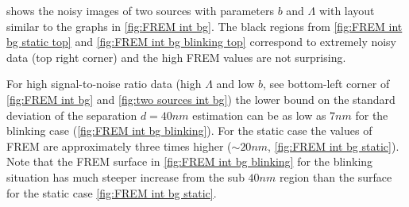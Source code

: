 %
 shows the noisy images of two sources with parameters $b$ and $\Lambda$ with layout similar to the graphs in \autoref{fig:FREM int bg}.  The black regions from \autoref{fig:FREM int bg static top} and \autoref{fig:FREM int bg blinking top} correspond to extremely noisy data (top right corner) and the high FREM values are not surprising. 

For high signal-to-noise ratio data (high $\Lambda$ and low $b$,  see bottom-left corner of \autoref{fig:FREM int bg} and \autoref{fig:two sources int bg}) the lower bound on the standard deviation of the separation $d=40\unit{nm}$ estimation can be as low as $7\unit{nm}$ for the blinking case (\autoref{fig:FREM int bg blinking}). For the static case the values of FREM are approximately three times higher ($\sim 20\unit{nm}$,  \autoref{fig:FREM int bg static}). Note that the FREM surface in \autoref{fig:FREM int bg blinking} for the blinking situation has much steeper increase from the sub $40\unit{nm}$ region than the surface for the static case \autoref{fig:FREM int bg static}.

